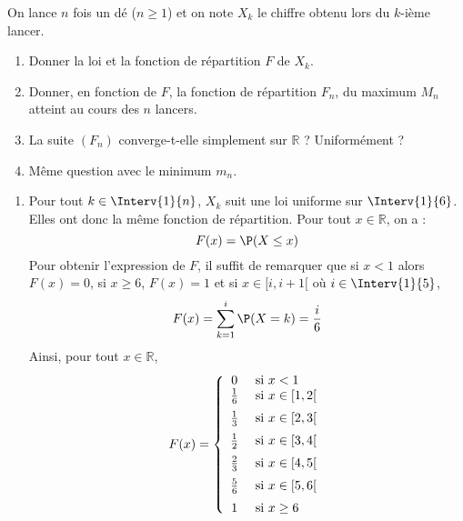 \documentclass[a4paper,10pt]{report}
\begin{document}
\begin{Exercice}{} On lance $n$ fois un dé ($n \geq 1$) et on note $X_k$ le chiffre obtenu lors du $k$-ième lancer.
\begin{enumerate}
\item Donner la loi et la fonction de répartition $F$ de $X_k$.
\item Donner, en fonction de $F$, la fonction de répartition $F_n$, du maximum $M_n$ atteint au cours des $n$ lancers.
\item La suite $(F_n)$ converge-t-elle simplement sur $\mathbb{R}$ ? Uniformément ?
\item Même question avec le minimum $m_n$.
\end{enumerate}
\end{Exercice}

\corr \begin{enumerate}
\item Pour tout $k \in \Interv{1}{n}$, $X_k$ suit une loi uniforme sur $\Interv{1}{6}$. Elles ont donc la même fonction de répartition. Pour tout $x \in \mathbb{R}$, on a :
$$ F(x) = \P(X \leq x)$$
Pour obtenir l'expression de $F$, il suffit de remarquer que si $x<1$ alors $F(x)=0$, si $x \geq 6$, $F(x)=1$ et si $x \in [i,i+1[$ où $i \in \Interv{1}{5}$,
$$ F(x) = \sum_{k=1}^{i} \P(X = k) = \dfrac{i}{6}$$
Ainsi, pour tout $x \in \mathbb{R}$,
$$ F(x) = \left\lbrace \begin{array}{cl}
0 & \hbox{ si } x<1\\
\tfrac{1}{6} & \hbox{ si } x \in [1,2[ \\[0.2cm]
\tfrac{1}{3} & \hbox{ si } x \in [2,3[ \\[0.2cm]
\tfrac{1}{2} & \hbox{ si } x \in [3,4[ \\[0.2cm]
\tfrac{2}{3} & \hbox{ si } x \in [4,5[ \\[0.2cm]
\tfrac{5}{6} & \hbox{ si } x \in [5,6[ \\[0.2cm]
1 & \hbox{ si } x \geq 6 \\
\end{array}\right.$$



\end{enumerate}
\end{document}
